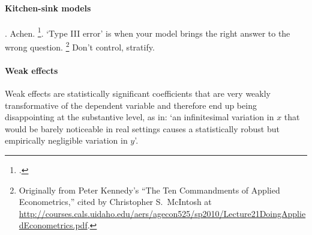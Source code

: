 \paragraph{Kitchen-sink models}. Achen.  \href{http://polmeth.wustl.edu/mediaDetail.php?docId=1246}{\footcite{Schrodt:2011a}}. `Type III error' is when your model brings the right answer to the wrong question.%
     \footnote{Originally from Peter Kennedy's ``The Ten Commandments of Applied Econometrics,'' cited by Christopher S.~McIntosh at \url{http://courses.cals.uidaho.edu/aers/agecon525/sp2010/Lecture21DoingAppliedEconometrics.pdf}.} %
     Don't control, stratify.

\paragraph{Weak effects} Weak effects are statistically significant coefficients that are very weakly transformative of the dependent variable and therefore end up being disappointing at the substantive level, as in: `an infinitesimal variation in $x$ that would be barely noticeable in real settings causes a statistically robust but empirically negligible variation in $y$'.%



  

